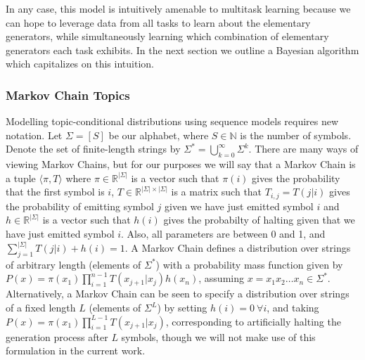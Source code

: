 \documentclass[letterpaper]{article}
\begin{document}
In any case, this model is intuitively amenable to multitask learning because we can hope to leverage data from all tasks to learn about the elementary generators, while simultaneously learning which combination of elementary generators each task exhibits.  In the next section we outline a Bayesian algorithm which capitalizes on this intuition.

\subsubsection{Markov Chain Topics}
Modelling topic-conditional distributions using sequence models requires new notation. Let $\Sigma = [S]$ be our alphabet, where $S \in \mathbb{N}$ is the number of symbols. Denote the set of finite-length strings by $\Sigma^* = \bigcup_{k=0}^\infty \Sigma^k$. There are many ways of viewing Markov Chains, but for our purposes we will say that a Markov Chain is a tuple $\langle \pi, T\rangle$ where $\pi \in \mathbb{R}^{|\Sigma|}$ is a vector such that $\pi(i)$ gives the probability that the first symbol is $i$, $T \in \mathbb{R}^{|\Sigma| \times |\Sigma|}$ is a matrix such that $T_{i,j} = T(j | i)$ gives the probability of emitting symbol $j$ given we have just emitted symbol $i$ and $h \in \mathbb{R}^{|\Sigma|}$ is a vector such that $h(i)$ gives the probabilty of halting given that we have just emitted symbol $i$. Also, all parameters are between 0 and 1, and $\sum_{j=1}^{|\Sigma|} T(j | i) + h(i) = 1$. A Markov Chain defines a distribution over strings of arbitrary length (elements of $\Sigma^*$) with a probability mass function given by $P(x) = \pi(x_1) \prod_{i=1}^{n-1} T(x_{j+1} | x_j) h(x_n)$, assuming $x = x_1x_2 \dots x_n \in \Sigma^*$. Alternatively, a Markov Chain can be seen to specify a distribution over strings of a fixed length $L$ (elements of $\Sigma^L$) by setting $h(i) = 0~\forall i$, and taking $P(x) = \pi(x_1) \prod_{i=1}^{L-1} T(x_{j+1} | x_j)$, corresponding to artificially halting the generation process after $L$ symbols, though we will not make use of this formulation in the current work.

\end{document}
